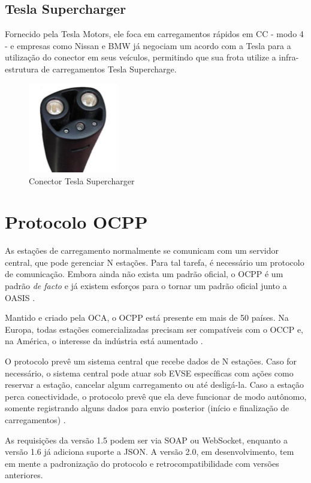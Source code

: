       \subsection{Tesla Supercharger}

        Fornecido pela Tesla Motors, ele foca em carregamentos rápidos em \ac{CC} - modo 4 - e empresas como Nissan e BMW já negociam um acordo com a Tesla para a utilização do conector em seus veículos, permitindo que sua frota utilize a infra-estrutura de carregamentos Tesla Supercharge.

        \begin{figure}[H]
          \begin{center}
            \includegraphics[width=0.35\textwidth,natwidth=300,natheight=300]{assets/images/connectors-tesla.jpg}
            \caption{Conector Tesla Supercharger}
            \label{fig:tesla}
          \end{center}
        \end{figure}

  \section{Protocolo OCPP}

    As estações de carregamento normalmente se comunicam com um servidor central, que pode gerenciar N estações. Para tal tarefa, é necessário um protocolo de comunicação. Embora ainda não exista um padrão oficial, o \ac{OCPP} é um padrão \textit{de facto} e já existem esforços para o tornar um padrão oficial junto a \ac{OASIS} \cite{ocpp-news-standardization}.

    Mantido e criado pela \ac{OCA}, o OCPP está presente em mais de 50 países. Na Europa, todas estações comercializadas precisam ser compatíveis com o OCCP e, na América, o interesse da indústria está aumentado \cite{ocpp-news-forbes}.

    O protocolo prevê um sistema central que recebe dados de N estações. Caso for necessário, o sistema central pode atuar sob \ac{EVSE} específicas com ações como reservar a estação, cancelar algum carregamento ou até desligá-la. Caso a estação perca conectividade, o protocolo prevê que ela deve funcionar de modo autônomo, somente registrando alguns dados para envio posterior (início e finalização de carregamentos) \cite{ocpp-spec-15}.

    As requisições da versão 1.5 podem ser via SOAP ou WebSocket, enquanto a versão 1.6 já adiciona suporte a JSON. A versão 2.0, em desenvolvimento, tem em mente a padronização do protocolo e retrocompatibilidade com versões anteriores.

